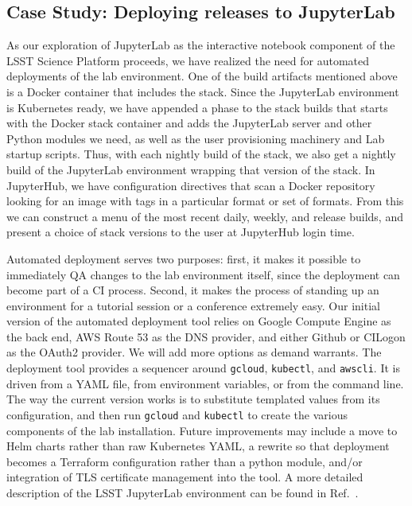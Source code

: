 \subsection{Case Study: Deploying releases to JupyterLab}
\label{sec:jupyterlab}

As our exploration of JupyterLab as the interactive notebook component
of the LSST Science Platform\cite{LSE-319} proceeds, we have realized the need for
automated deployments of the lab environment.
One of the build artifacts mentioned above is a Docker container that includes the stack.
Since the
JupyterLab environment is Kubernetes ready, we have appended a phase to
the stack builds that starts with the Docker stack container and adds
the JupyterLab server and other Python modules we need, as well as the
user provisioning machinery and Lab startup scripts.  Thus, with each
nightly build of the stack, we also get a nightly build of the
JupyterLab environment wrapping that version of the stack.  In
JupyterHub, we have configuration directives that scan a Docker
repository looking for an image with tags in a particular format or set
of formats.  From this we can construct a menu of the most recent daily,
weekly, and release builds, and present a choice of stack versions to
the user at JupyterHub login time.

\noindent Automated deployment serves two
purposes: first, it makes it possible to immediately QA changes to the
lab environment itself, since the deployment can become part of a CI
process.  Second, it makes the process of standing up an environment for
a tutorial session or a conference extremely easy.  Our initial version
of the automated deployment tool relies on Google Compute Engine as the
back end, AWS Route 53 as the DNS provider, and either Github or CILogon
as the OAuth2 provider.  We will add more options as demand warrants.
The deployment tool provides a sequencer around \texttt{gcloud}, \texttt{kubectl}, and
\texttt{awscli}.  It is driven from a YAML file, from environment variables, or
from the command line.  The way the current version works is to
substitute templated values from its configuration, and then run \texttt{gcloud}
and \texttt{kubectl} to create the various components of the lab installation.
Future improvements may include a move to Helm charts rather than raw
Kubernetes YAML, a rewrite so that deployment becomes a Terraform
configuration rather than a python module, and/or integration of TLS
certificate management into the tool.
 A more detailed description of the LSST JupyterLab environment can be found in Ref.~.

